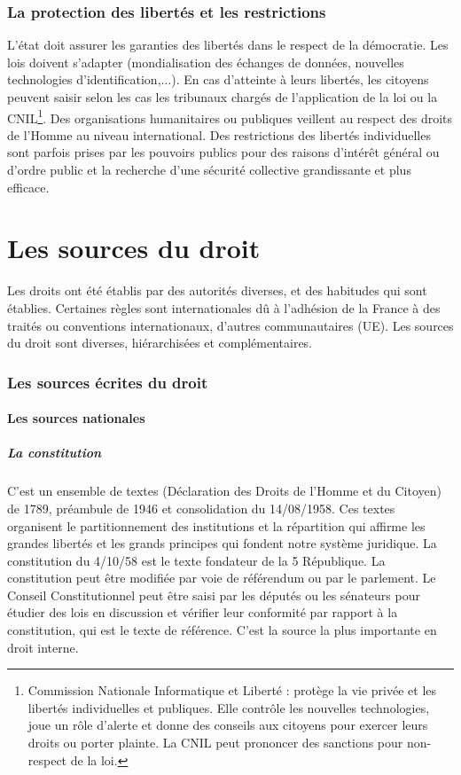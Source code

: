 \documentclass[11pt]{article}
\begin{document}
	\section{La protection des libertés et les restrictions}
		L'état doit assurer les garanties des libertés dans le respect de la démocratie. Les lois doivent s'adapter (mondialisation des échanges de données, nouvelles technologies d'identification,...). En cas d'atteinte à leurs libertés, les citoyens peuvent saisir selon les cas les tribunaux chargés de l'application de la loi ou la CNIL\footnote{Commission Nationale Informatique et Liberté : protège la vie privée et les libertés individuelles et publiques. Elle contrôle les nouvelles technologies, joue un rôle d'alerte et donne des conseils aux citoyens pour exercer leurs droits ou porter plainte. La CNIL peut prononcer des sanctions pour non-respect de la loi.}. Des organisations humanitaires ou publiques veillent au respect des droits de l'Homme au niveau international. Des restrictions des libertés individuelles sont parfois prises par les pouvoirs publics pour des raisons d'intérêt général ou d'ordre public et la recherche d'une sécurité collective grandissante et plus efficace.

\newpage
\part{Les sources du droit}
	Les droits ont été établis par des autorités diverses, et des habitudes qui sont établies. Certaines règles sont internationales dû à l'adhésion de la France à des traités ou conventions internationaux, d'autres communautaires (UE). Les sources du droit sont diverses, hiérarchisées et complémentaires.

	\section{Les sources écrites du droit}
		\subsection{Les sources nationales}
			\subsubsection{La constitution}
				C'est un ensemble de textes (Déclaration des Droits de l'Homme et du Citoyen) de 1789, préambule de 1946 et consolidation du 14/08/1958. Ces textes organisent le partitionnement des institutions et la répartition qui affirme les grandes libertés et les grands principes qui fondent notre système juridique. La constitution du 4/10/58 est le texte fondateur de la 5 République. La constitution peut être modifiée par voie de référendum ou par le parlement. Le Conseil Constitutionnel peut être saisi par les députés ou les sénateurs pour étudier des lois en discussion et vérifier leur conformité par rapport à la constitution, qui est le texte de référence. C'est la source la plus importante en droit interne.
	
\end{document}
